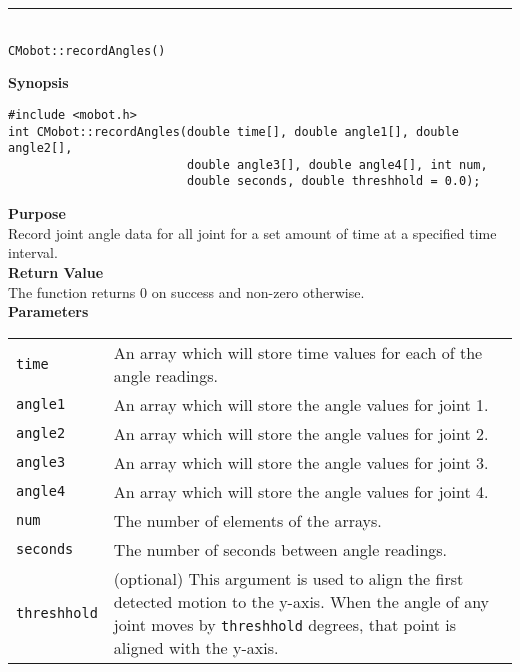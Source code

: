 \noindent
\vspace{5pt}
\rule{4.5in}{0.015in}\\
\noindent
{\LARGE \texttt{CMobot::recordAngles()}}\\
{}

\noindent
{\bf Synopsis}
\vspace{-8pt}
\begin{verbatim}
#include <mobot.h>
int CMobot::recordAngles(double time[], double angle1[], double angle2[], 
                         double angle3[], double angle4[], int num, 
                         double seconds, double threshhold = 0.0);
\end{verbatim}

\noindent
{\bf Purpose}\\
Record joint angle data for all joint for a set amount of time at a specified time interval.\\

\noindent
{\bf Return Value}\\
The function returns 0 on success and non-zero otherwise.\\

\noindent
{\bf Parameters}\\
\vspace{-0.1in}
\begin{description}
\item               
\begin{tabular}{p{15 mm}p{145 mm}}
\texttt{time} & An array which will store time values for each of the angle readings. \\
\texttt{angle1} & An array which will store the angle values for joint 1. \\
\texttt{angle2} & An array which will store the angle values for joint 2. \\
\texttt{angle3} & An array which will store the angle values for joint 3. \\
\texttt{angle4} & An array which will store the angle values for joint 4. \\
\texttt{num} & The number of elements of the arrays. \\
\texttt{seconds} & The number of seconds between angle readings. \\
\texttt{threshhold} & (optional) This argument is used to align the first
detected motion to the y-axis. When the angle of any joint moves by
\texttt{threshhold} degrees, that point is aligned with the y-axis.
\end{tabular}
\end{description}

